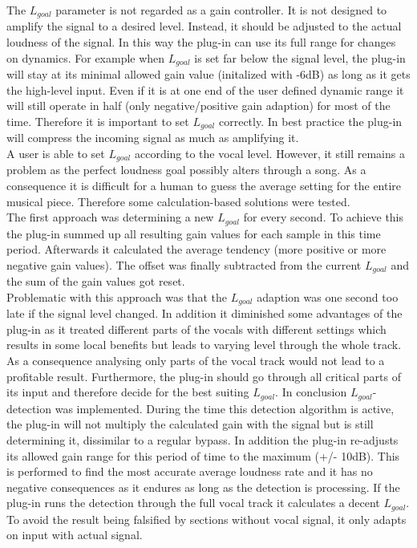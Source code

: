 The $L_{goal}$ parameter is not regarded as a gain controller. It is not designed to amplify the signal to a desired level. Instead, it should be adjusted to the actual loudness of the signal. In this way the plug-in can use its full range for changes on dynamics. For example when $L_{goal}$ is set far below the signal level, the plug-in will stay at its minimal allowed gain value (initalized with -6dB) as long as it gets the high-level input. Even if it is at one end of the user defined dynamic range it will still operate in half (only negative/positive gain adaption) for most of the time. Therefore it is important to set $L_{goal}$ correctly. In best practice the plug-in will compress the incoming signal as much as amplifying it.\\
A user is able to set $L_{goal}$ according to the vocal level. However, it still remains a problem as the perfect loudness goal possibly alters through a song. As a consequence it is difficult for a human to guess the average setting for the entire musical piece. Therefore some calculation-based solutions were tested.\\
The first approach was determining a new $L_{goal}$ for every second. To achieve this the plug-in summed up all resulting gain values for each sample in this time period. Afterwards it calculated the average tendency (more positive or more negative gain values). The offset was finally subtracted from the current $L_{goal}$ and the sum of the gain values got reset.\\
Problematic with this approach was that the $L_{goal}$ adaption was one second too late if the signal level changed. In addition it diminished some advantages of the plug-in as it treated different parts of the vocals with different settings which results in some local benefits but leads to varying level through the whole track.\\
As a consequence analysing only parts of the vocal track would not lead to a profitable result. Furthermore, the plug-in should go through all critical parts of its input and therefore decide for the best suiting $L_{goal}$. In conclusion $L_{goal}$-detection was implemented. During the time this detection algorithm is active, the plug-in will not multiply the calculated gain with the signal but is still determining it, dissimilar to a regular bypass. In addition the plug-in re-adjusts its allowed gain range for this period of time to the maximum (+/- 10dB). This is performed to find the most accurate average loudness rate and it has no negative consequences as it endures as long as the detection is processing. If the plug-in runs the detection through the full vocal track it calculates a decent $L_{goal}$. To avoid the result being falsified by sections without vocal signal, it only adapts on input with actual signal.\\
